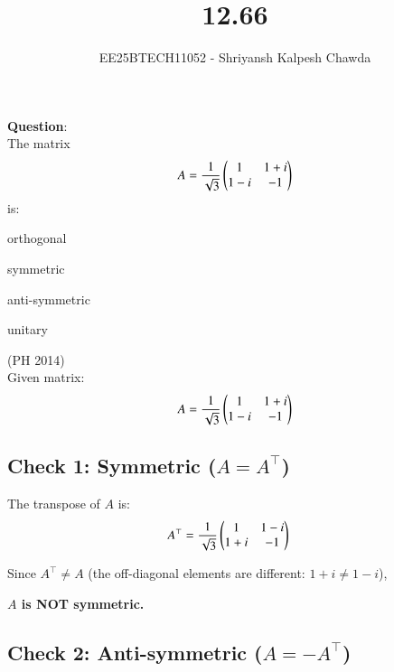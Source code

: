 \documentclass[journal]{IEEEtran}
\begin{document}
	
	
	\vspace{3cm}
	
	\title{12.66}
	\author{EE25BTECH11052 - Shriyansh Kalpesh Chawda}
	{\let\newpage\relax\maketitle}
	
	\renewcommand{\thefigure}{\theenumi}
	\renewcommand{\thetable}{\theenumi}
	\setlength{\intextsep}{10pt} 
	
	\renewcommand{\thetable}{\theenumi}
	\textbf{Question}:\\
The matrix $$ A = \frac{1}{\sqrt{3}} \begin{pmatrix}1 & 1 + i \\ 1 - i & -1\end{pmatrix} $$ is:\\
\begin{enumerate}
\begin{multicols}{4}
\item orthogonal  
\item symmetric 
\item anti-symmetric 
\item unitary
\end{multicols}
\end{enumerate}
\hfill{(PH 2014)}\\
\solution
Given matrix:
\begin{equation}
	A = \frac{1}{\sqrt{3}}\begin{pmatrix}1 & 1+i \\ 1-i & -1\end{pmatrix}
\end{equation}

\subsection*{Check 1: Symmetric ($A = A^\top$)}

The transpose of $A$ is:
\begin{align}
	A^\top &= \frac{1}{\sqrt{3}}\begin{pmatrix}1 & 1-i \\ 1+i & -1\end{pmatrix}
\end{align}

Since $A^\top \neq A$ (the off-diagonal elements are different: $1+i \neq 1-i$), 

\textbf{$A$ is NOT symmetric.}

\subsection*{Check 2: Anti-symmetric ($A = -A^\top$)}
\end{document}
